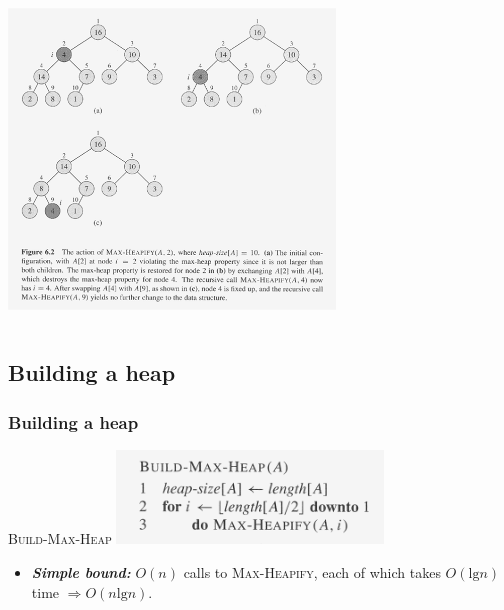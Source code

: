 \documentclass[notes,serif]{beamer}
\begin{document}
\begin{frame}
\begin{columns}
  \begin{block}{}
    \includegraphics[height=8cm]{06-fig-max_heapify}
  \end{block}
\end{columns}
\end{frame}

\subsection{Building a heap}
\begin{frame}
  \frametitle{Building a heap}
  \begin{block}{\textsc{\small Build-Max-Heap}}
    \includegraphics[height=2.5cm]{06-build_max_heap}
  \end{block}
  
  \begin{block}{}
  \begin{itemize}
    \item {\bf \em Simple bound:} $O(n)$ calls to \textsc{Max-Heapify}, each of which takes $O(\text{lg} n)$ time $ \Rightarrow O(n \text{lg} n)$.
  \end{itemize}
  \end{block}
\end{frame}
\end{document}
